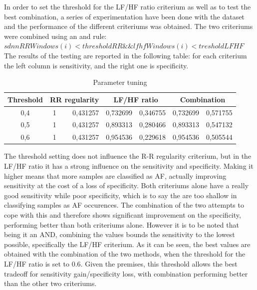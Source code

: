 \documentclass[a4paper,titlepage]{article}
\begin{document}
In order to set the threshold for the LF/HF ratio criterium as well as to test the best combination, a series of experimentation have been done with the dataset and the performance of the different criteriums was obtained.
The two criteriums were combined using an and rule:
\\$sdnnRRWindows(i) < thresholdRR \&\& lfhfWindows(i) < tresholdLFHF$\\
The results of the testing are reported in the following table: for each criterium the left column is sensitivity, and the right one is specificity.

\begin{table}[htbp]
  \centering
  \caption{Parameter tuning}
    \begin{tabular}{c |rr|rr|rr|}
    \multicolumn{1}{c|}{Threshold} & \multicolumn{2}{c|}{RR regularity} & \multicolumn{2}{c|}{LF/HF ratio} & \multicolumn{2}{c|}{Combination} \\ \hline
    0,4   & 1     & 0,431257 & 0,732699 & 0,346755 & 0,732699 & 0,571755 \\
    0,5   & 1     & 0,431257 & 0,893313 & 0,280466 & 0,893313 & 0,547132 \\
    0,6   & 1     & 0,431257 & 0,954536 & 0,229618 & 0,954536 & 0,505544 \\
    \end{tabular}%
  \label{tab:addlabel}%
\end{table}%

The threshold setting does not influence the R-R regularity criterium, but in the LF/HF ratio it has a strong influence on the sensitivity and specificity. Making it higher means that more samples are classified as AF, actually improving sensitivity at the cost of a loss of specificity.
Both criteriums alone have a really good sensitivity while poor specificity, which is to say the are too shallow in classifying samples as AF occurences. The combination of the two attempts to cope with this and therefore shows significant improvement on the specificity, performing better than both criteriums alone. However it is to be noted that being it an AND, combining the values bounds the sensitivity to the lowest possible, specifically the LF/HF criterium.
As it can be seen, the best values are obtained with the combination of the two methods, when the threshold for the LF/HF ratio is set to 0.6.  Given the premises, this threshold allows the best tradeoff for sensitivity gain/specificity loss, with combination performing better than the other two criteriums.
\end{document}
